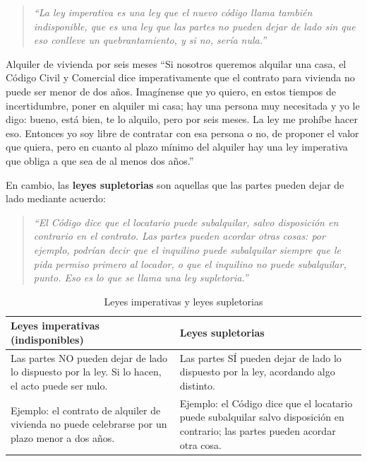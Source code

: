 \documentclass[12pt,oneside]{book}
\begin{document}
\begin{quote}
\itshape
``La ley imperativa es una ley que el nuevo código llama también indisponible, que es una ley que las partes no pueden dejar de lado sin que eso conlleve un quebrantamiento, y si no, sería nula.''
\end{quote}

\begin{example}{Alquiler de vivienda por seis meses}
``Si nosotros queremos alquilar una casa, el Código Civil y Comercial dice imperativamente que el contrato para vivienda no puede ser menor de dos años. Imagínense que yo quiero, en estos tiempos de incertidumbre, poner en alquiler mi casa; hay una persona muy necesitada y yo le digo: bueno, está bien, te lo alquilo, pero por seis meses. La ley me prohíbe hacer eso. Entonces yo soy libre de contratar con esa persona o no, de proponer el valor que quiera, pero en cuanto al plazo mínimo del alquiler hay una ley imperativa que obliga a que sea de al menos dos años.''
\end{example}

En cambio, las \textbf{leyes supletorias} son aquellas que las partes pueden dejar de lado mediante acuerdo:

\begin{quote}
\itshape
``El Código dice que el locatario puede subalquilar, salvo disposición en contrario en el contrato. Las partes pueden acordar otras cosas: por ejemplo, podrían decir que el inquilino puede subalquilar siempre que le pida permiso primero al locador, o que el inquilino no puede subalquilar, punto. Eso es lo que se llama una ley supletoria.''
\end{quote}

\begin{table}[H]
\centering
\caption{Leyes imperativas y leyes supletorias}
\begin{tabularx}{\textwidth}{>{\raggedright\arraybackslash}X >{\raggedright\arraybackslash}X}
\toprule
\textbf{Leyes imperativas (indisponibles)} & \textbf{Leyes supletorias} \\
\midrule
Las partes NO pueden dejar de lado lo dispuesto por la ley. Si lo hacen, el acto puede ser nulo. &
Las partes SÍ pueden dejar de lado lo dispuesto por la ley, acordando algo distinto. \\
\addlinespace
Ejemplo: el contrato de alquiler de vivienda no puede celebrarse por un plazo menor a dos años. &
Ejemplo: el Código dice que el locatario puede subalquilar salvo disposición en contrario; las partes pueden acordar otra cosa. \\
\bottomrule
\end{tabularx}
\end{table}
\end{document}
